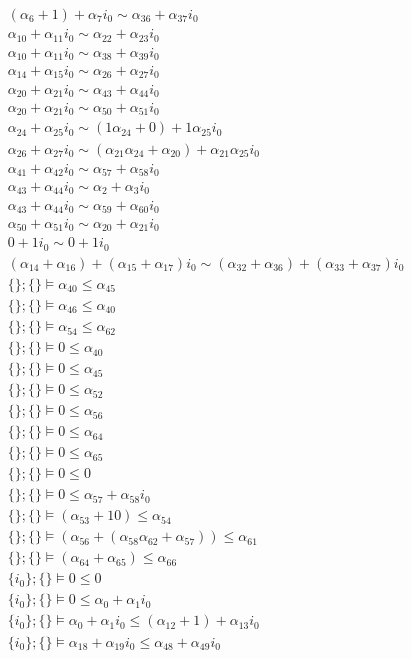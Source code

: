 {\begin{align*}
    (\alpha_{6}+1) + \alpha_{7}i_{0} \sim \alpha_{36} + \alpha_{37}i_{0}\\ \alpha_{10} + \alpha_{11}i_{0} \sim \alpha_{22} + \alpha_{23}i_{0}\\ \alpha_{10} + \alpha_{11}i_{0} \sim \alpha_{38} + \alpha_{39}i_{0}\\ \alpha_{14} + \alpha_{15}i_{0} \sim \alpha_{26} + \alpha_{27}i_{0}\\ \alpha_{20} + \alpha_{21}i_{0} \sim \alpha_{43} + \alpha_{44}i_{0}\\ \alpha_{20} + \alpha_{21}i_{0} \sim \alpha_{50} + \alpha_{51}i_{0}\\ \alpha_{24} + \alpha_{25}i_{0} \sim (1\alpha_{24}+0) + 1\alpha_{25}i_{0}\\ \alpha_{26} + \alpha_{27}i_{0} \sim (\alpha_{21}\alpha_{24}+\alpha_{20}) + \alpha_{21}\alpha_{25}i_{0}\\ \alpha_{41} + \alpha_{42}i_{0} \sim \alpha_{57} + \alpha_{58}i_{0}\\ \alpha_{43} + \alpha_{44}i_{0} \sim \alpha_{2} + \alpha_{3}i_{0}\\ \alpha_{43} + \alpha_{44}i_{0} \sim \alpha_{59} + \alpha_{60}i_{0}\\ \alpha_{50} + \alpha_{51}i_{0} \sim \alpha_{20} + \alpha_{21}i_{0}\\ 0 + 1i_{0} \sim 0 + 1i_{0}\\ (\alpha_{14}+\alpha_{16}) + (\alpha_{15}+\alpha_{17})i_{0} \sim (\alpha_{32}+\alpha_{36}) + (\alpha_{33}+\alpha_{37})i_{0}\\ \{\};\{\}  \vDash \alpha_{40} \leq \alpha_{45}\\ \{\};\{\}  \vDash \alpha_{46} \leq \alpha_{40}\\ \{\};\{\}  \vDash \alpha_{54} \leq \alpha_{62}\\ \{\};\{\}  \vDash 0 \leq \alpha_{40}\\ \{\};\{\}  \vDash 0 \leq \alpha_{45}\\ \{\};\{\}  \vDash 0 \leq \alpha_{52}\\ \{\};\{\}  \vDash 0 \leq \alpha_{56}\\ \{\};\{\}  \vDash 0 \leq \alpha_{64}\\ \{\};\{\}  \vDash 0 \leq \alpha_{65}\\ \{\};\{\}  \vDash 0 \leq 0\\ \{\};\{\}  \vDash 0 \leq \alpha_{57} + \alpha_{58}i_{0}\\ \{\};\{\}  \vDash (\alpha_{53}+10) \leq \alpha_{54}\\ \{\};\{\}  \vDash (\alpha_{56}+(\alpha_{58}\alpha_{62}+\alpha_{57})) \leq \alpha_{61}\\ \{\};\{\}  \vDash (\alpha_{64}+\alpha_{65}) \leq \alpha_{66}\\ \{i_{0}\};\{\}  \vDash 0 \leq 0\\ \{i_{0}\};\{\}  \vDash 0 \leq \alpha_{0} + \alpha_{1}i_{0}\\ \{i_{0}\};\{\}  \vDash \alpha_{0} + \alpha_{1}i_{0} \leq (\alpha_{12}+1) + \alpha_{13}i_{0}\\ \{i_{0}\};\{\}  \vDash \alpha_{18} + \alpha_{19}i_{0} \leq \alpha_{48} + \alpha_{49}i_{0}\\ 
\end{align*}}
